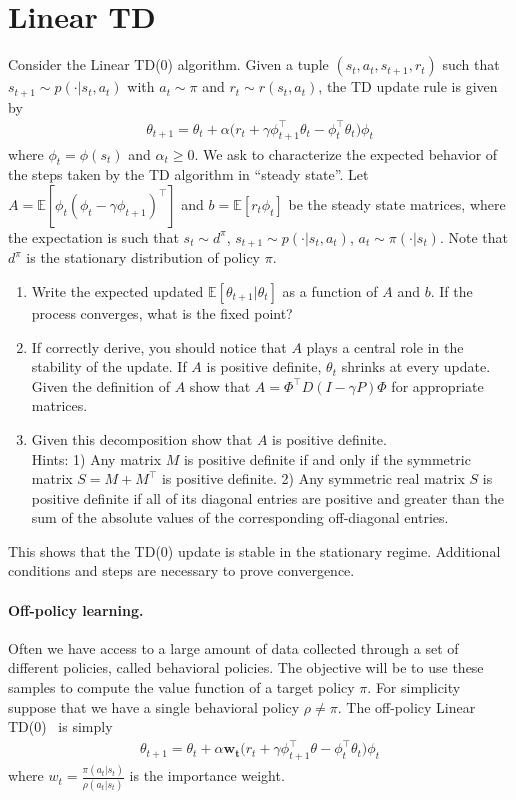 \documentclass[a4paper]{article}
\newcommand{\transp}{\intercal}
\begin{document}
\section{Linear TD}
Consider the Linear TD(0) algorithm. Given a tuple $(s_t, a_t, s_{t+1}, r_t)$ such that $s_{t+1} \sim p(\cdot| s_t,a_t)$ with $a_t \sim  \pi$ and $r_t \sim r(s_t, a_t)$, the TD update rule is given by
\begin{align*}
    \theta_{t+1} = \theta_t + \alpha \Big(r_t + \gamma \phi_{t+1}^\transp \theta_t - \phi_t^\transp \theta_t\Big) \phi_t
\end{align*}
where $\phi_t = \phi(s_t)$ and $\alpha_t \geq  0$.
We ask to characterize the expected behavior of the steps taken by the TD algorithm in ``steady state''.
Let $A = \mathbb{E}[\phi_t(\phi_t  - \gamma \phi_{t+1})^\transp]$ and $b = \mathbb{E}[r_t \phi_t]$ be the steady state matrices, where the expectation is such that $s_t \sim d^{\pi}$, $s_{t+1} \sim p(\cdot| s_t, a_t)$,  $a_t \sim \pi(\cdot|s_t)$. Note that $d^{\pi}$ is the stationary distribution of policy $\pi$.
\begin{enumerate}
    \item Write the expected updated $\mathbb{E}[\theta_{t+1}| \theta_t]$ as a function of  $A$ and $b$. If the process converges, what is the fixed point?
    \item If correctly derive, you should notice that $A$ plays a central role in the stability of the update. If  $A$ is positive definite, $\theta_t$ shrinks at every update. Given the definition of $A$ show that $A = \Phi^\transp D (I - \gamma P) \Phi$ for appropriate matrices.
    \item Given this decomposition show that $A$ is positive definite.\\
          Hints: 1) Any matrix $M$ is positive definite if and only if the symmetric matrix $S = M + M^\transp$ is positive definite.
          2) Any symmetric real matrix $S$ is positive definite if all of its diagonal entries are positive and greater
          than the sum of the absolute values of the corresponding off-diagonal entries.
\end{enumerate}
This shows that the TD(0) update is stable in the stationary regime. Additional conditions and steps are necessary to prove convergence.


\paragraph{Off-policy learning.}
Often we have access to a large amount of data collected through a set of different policies, called behavioral policies.
The objective will be to use these samples to compute the value function of a target policy $\pi$. For simplicity suppose that we have a single behavioral policy $\rho \neq \pi$.
The off-policy Linear TD(0)~\citep{PrecupSD01} is simply
\begin{align}\label{eq:offtdlin}
    \theta_{t+1} = \theta_t + \alpha \boldsymbol{w_t} \Big(r_t + \gamma \phi_{t+1}^\transp \theta - \phi_t^\transp \theta_t\Big) \phi_t
\end{align}
where $w_t = \frac{\pi(a_t|s_t)}{\rho(a_t|s_t)}$ is the importance weight.
\end{document}
